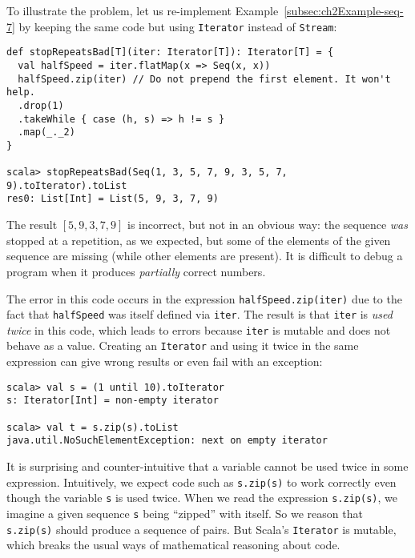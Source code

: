 To illustrate the problem, let us re-implement Example~\ref{subsec:ch2Example-seq-7}
by keeping the same code but using \lstinline!Iterator! instead of
\lstinline!Stream!:
\begin{lstlisting}
def stopRepeatsBad[T](iter: Iterator[T]): Iterator[T] = {
  val halfSpeed = iter.flatMap(x => Seq(x, x))
  halfSpeed.zip(iter) // Do not prepend the first element. It won't help.
  .drop(1)
  .takeWhile { case (h, s) => h != s }
  .map(_._2)
}

scala> stopRepeatsBad(Seq(1, 3, 5, 7, 9, 3, 5, 7, 9).toIterator).toList
res0: List[Int] = List(5, 9, 3, 7, 9)
\end{lstlisting}
The result $\left[5,9,3,7,9\right]$ is incorrect, but not in an obvious
way: the sequence \emph{was} stopped at a repetition, as we expected,
but some of the elements of the given sequence are missing (while
other elements are present). It is difficult to debug a program when
it produces \emph{partially} correct numbers.

The error in this code occurs in the expression \lstinline!halfSpeed.zip(iter)!
due to the fact that \lstinline!halfSpeed! was itself defined via
\lstinline!iter!. The result is that \lstinline!iter! is \emph{used
twice} in this code, which leads to errors because \lstinline!iter!
is mutable and does not behave as a value. Creating an \lstinline!Iterator!
and using it twice in the same expression can give wrong results or
even fail with an exception:
\begin{lstlisting}
scala> val s = (1 until 10).toIterator
s: Iterator[Int] = non-empty iterator

scala> val t = s.zip(s).toList
java.util.NoSuchElementException: next on empty iterator
\end{lstlisting}
It is surprising and counter-intuitive that a variable cannot be used
twice in some expression. Intuitively, we expect code such as \lstinline!s.zip(s)!
to work correctly even though the variable \lstinline!s! is used
twice. When we read the expression \lstinline!s.zip(s)!, we imagine
a given sequence \lstinline!s! being ``zipped'' with itself. So
we reason that \lstinline!s.zip(s)! should produce a sequence of
pairs. But Scala's \lstinline!Iterator! is mutable, which breaks
the usual ways of mathematical reasoning about code.

